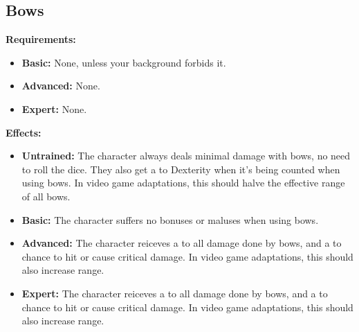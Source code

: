 \documentclass[openany,10pt,a4paper]{book}
\begin{document}
\subsection{Bows}
\begin{table}[!ht]
\centering
{}
\end{table}
\textbf{Requirements:}
\begin{itemize}
	\item \textbf{Basic:} None, unless your background forbids it.
	\item \textbf{Advanced:} None.
	\item \textbf{Expert:} None.
\end{itemize}
\textbf{Effects:}
\begin{itemize}
	\item \textbf{Untrained:} The character always deals minimal damage with bows, no need to roll the dice. They also get a  to Dexterity when it's being counted when using bows. In video game adaptations, this should halve the effective range of all bows.
	\item \textbf{Basic:} The character suffers no bonuses or maluses when using bows.
	\item \textbf{Advanced:} The character reiceves a  to all damage done by bows, and a  to chance to hit or cause critical damage. In video game adaptations, this should also increase range.
	\item \textbf{Expert:} The character reiceves a  to all damage done by bows, and a  to chance to hit or cause critical damage. In video game adaptations, this should also increase range.
\end{itemize}\newpage
\end{document}
